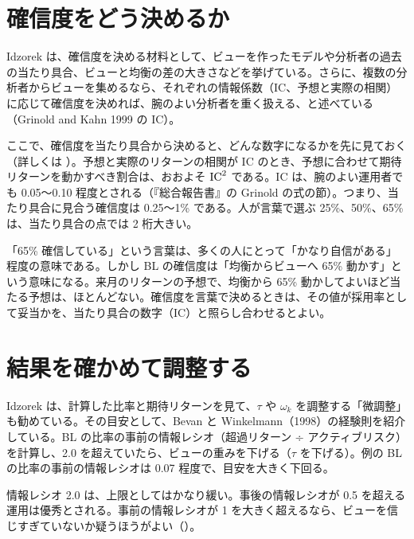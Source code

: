 \section{確信度をどう決めるか}

Idzorek は、確信度を決める材料として、ビューを作ったモデルや分析者の過去の当たり具合、ビューと均衡の差の大きさなどを挙げている。さらに、複数の分析者からビューを集めるなら、それぞれの情報係数（IC、予想と実際の相関）に応じて確信度を決めれば、腕のよい分析者を重く扱える、と述べている（Grinold and Kahn 1999 の IC）。

ここで、確信度を当たり具合から決めると、どんな数字になるかを先に見ておく（詳しくは ）。予想と実際のリターンの相関が IC のとき、予想に合わせて期待リターンを動かすべき割合は、おおよそ $\mathrm{IC}^2$ である。IC は、腕のよい運用者でも 0.05〜0.10 程度とされる（『総合報告書』の Grinold の式の節）。つまり、当たり具合に見合う確信度は 0.25〜1\% である。人が言葉で選ぶ 25\%、50\%、65\% は、当たり具合の点では 2 桁大きい。

\begin{notebox}
「65\% 確信している」という言葉は、多くの人にとって「かなり自信がある」程度の意味である。しかし BL の確信度は「均衡からビューへ 65\% 動かす」という意味になる。来月のリターンの予想で、均衡から 65\% 動かしてよいほど当たる予想は、ほとんどない。確信度を言葉で決めるときは、その値が採用率として妥当かを、当たり具合の数字（IC）と照らし合わせるとよい。
\end{notebox}

\section{結果を確かめて調整する}

Idzorek は、計算した比率と期待リターンを見て、$\tau$ や $\omega_k$ を調整する「微調整」も勧めている。その目安として、Bevan と Winkelmann（1998）の経験則を紹介している。BL の比率の事前の情報レシオ（超過リターン ÷ アクティブリスク）を計算し、2.0 を超えていたら、ビューの重みを下げる（$\tau$ を下げる）。例の BL の比率の事前の情報レシオは 0.07 程度で、目安を大きく下回る。

情報レシオ 2.0 は、上限としてはかなり緩い。事後の情報レシオが 0.5 を超える運用は優秀とされる。事前の情報レシオが 1 を大きく超えるなら、ビューを信じすぎていないか疑うほうがよい（）。

